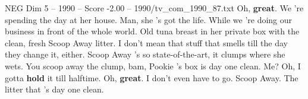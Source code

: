 \begin{textsample}{NEG Dim 5 – 1990 – Score -2.00 – 1990/tv\_com\_1990\_87.txt}  \label{ex:f5_neg_071}
Oh, \textbf{great}.
We 're spending the day at her house.
Man, she 's got the life.
While we 're doing our business in front of the whole world.
Old tuna breast in her private box with the clean, fresh Scoop Away litter.
I don't mean that stuff that smells till the day they change it, either.
Scoop Away 's so state-of-the-art, it clumps where she wets.
You scoop away the clump, bam, Pookie 's box is day one clean.
Me?
Oh, I gotta \textbf{hold} it till halftime.
Oh, \textbf{great}.
I don't even have to go.
Scoop Away.
The litter that 's day one clean.

\end{textsample}

